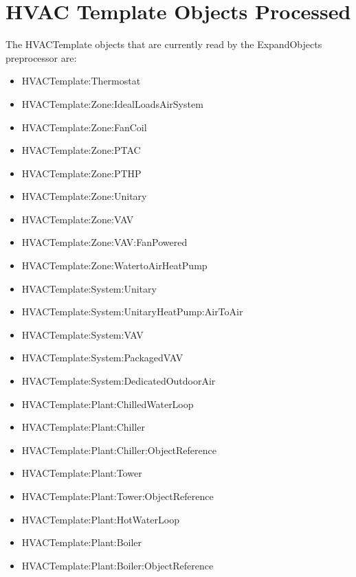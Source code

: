 \section{HVAC Template Objects Processed}\label{hvac-template-objects-processed}

The HVACTemplate objects that are currently read by the ExpandObjects preprocessor are:

\begin{itemize}
\item
  HVACTemplate:Thermostat
\item
  HVACTemplate:Zone:IdealLoadsAirSystem
\item
  HVACTemplate:Zone:FanCoil
\item
  HVACTemplate:Zone:PTAC
\item
  HVACTemplate:Zone:PTHP
\item
  HVACTemplate:Zone:Unitary
\item
  HVACTemplate:Zone:VAV
\item
  HVACTemplate:Zone:VAV:FanPowered
\item
  HVACTemplate:Zone:WatertoAirHeatPump
\item
  HVACTemplate:System:Unitary
\item
  HVACTemplate:System:UnitaryHeatPump:AirToAir
\item
  HVACTemplate:System:VAV
\item
  HVACTemplate:System:PackagedVAV
\item
  HVACTemplate:System:DedicatedOutdoorAir
\item
  HVACTemplate:Plant:ChilledWaterLoop
\item
  HVACTemplate:Plant:Chiller
\item
  HVACTemplate:Plant:Chiller:ObjectReference
\item
  HVACTemplate:Plant:Tower
\item
  HVACTemplate:Plant:Tower:ObjectReference
\item
  HVACTemplate:Plant:HotWaterLoop
\item
  HVACTemplate:Plant:Boiler
\item
  HVACTemplate:Plant:Boiler:ObjectReference
\end{itemize}
